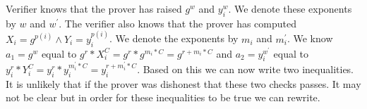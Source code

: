  Verifier knows that the prover has raised \begin{math}g^w\end{math} and \begin{math}y_i^w\end{math}. We denote these exponents by \begin{math}w\end{math}    and \begin{math}w^{'}\end{math}. The verifier also knows that the prover has computed \begin{math}X_i=g^{p(i)}  \land Y_i=y_i^{p(i)} \end{math}. We denote the exponents by \begin{math}m_i\end{math} and \begin{math}m_i^{'}\end{math}. We know
\begin{math} a_1= g^w \end{math} equal to \begin{math}g^r * X_i^C=g^r*g^{m_i*C} = g^{r+m_i*C}\end{math} and
\begin{math} a_2= y_i^{w^{'}}\end{math} equal to \begin{math}y_i^r * Y_i^C=y_i^r*y_i^{m_i^{'}*C} = y_i^{r+m_i^{'}*C}\end{math}.
Based on this we can now write two inequalities. It is unlikely that if the prover was dishonest that these two checks passes. It may not be clear but in order for these inequalities to be true we can rewrite.

